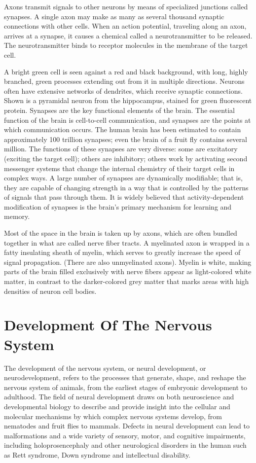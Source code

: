 Axons transmit signals to other neurons by means of specialized junctions called synapses. A single axon may make as many as several thousand synaptic connections with other cells. When an action potential, traveling along an axon, arrives at a synapse, it causes a chemical called a neurotransmitter to be released. The neurotransmitter binds to receptor molecules in the membrane of the target cell.

A bright green cell is seen against a red and black background, with long, highly branched, green processes extending out from it in multiple directions.
Neurons often have extensive networks of dendrites, which receive synaptic connections. Shown is a pyramidal neuron from the hippocampus, stained for green fluorescent protein.
Synapses are the key functional elements of the brain. The essential function of the brain is cell-to-cell communication, and synapses are the points at which communication occurs. The human brain has been estimated to contain approximately 100 trillion synapses; even the brain of a fruit fly contains several million. The functions of these synapses are very diverse: some are excitatory (exciting the target cell); others are inhibitory; others work by activating second messenger systems that change the internal chemistry of their target cells in complex ways. A large number of synapses are dynamically modifiable; that is, they are capable of changing strength in a way that is controlled by the patterns of signals that pass through them. It is widely believed that activity-dependent modification of synapses is the brain's primary mechanism for learning and memory.

Most of the space in the brain is taken up by axons, which are often bundled together in what are called nerve fiber tracts. A myelinated axon is wrapped in a fatty insulating sheath of myelin, which serves to greatly increase the speed of signal propagation. (There are also unmyelinated axons). Myelin is white, making parts of the brain filled exclusively with nerve fibers appear as light-colored white matter, in contrast to the darker-colored grey matter that marks areas with high densities of neuron cell bodies.

\hypertarget{development-of-the-nervous-system-1}{%
\chapter{Development Of The Nervous System}\label{development-of-the-nervous-system-1}}

The development of the nervous system, or neural development, or neurodevelopment, refers to the processes that generate, shape, and reshape the nervous system of animals, from the earliest stages of embryonic development to adulthood. The field of neural development draws on both neuroscience and developmental biology to describe and provide insight into the cellular and molecular mechanisms by which complex nervous systems develop, from nematodes and fruit flies to mammals. Defects in neural development can lead to malformations and a wide variety of sensory, motor, and cognitive impairments, including holoprosencephaly and other neurological disorders in the human such as Rett syndrome, Down syndrome and intellectual disability.

